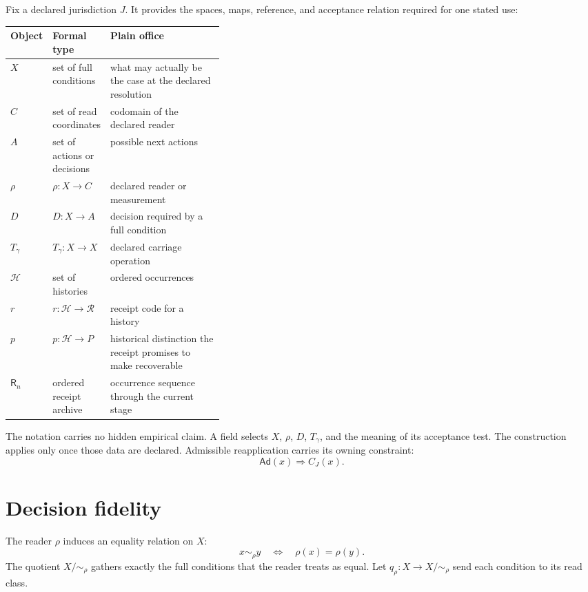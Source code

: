 \documentclass[11pt]{article}
\begin{document}
Fix a declared jurisdiction $J$. It provides the spaces, maps, reference, and acceptance relation required for one stated use:

\begin{center}
\begin{tabularx}{\linewidth}{@{}>{\bfseries}p{0.14\linewidth}p{0.22\linewidth}Y@{}}
\toprule
Object & Formal type & Plain office \\
\midrule
$X$ & set of full conditions & what may actually be the case at the declared resolution \\
$C$ & set of read coordinates & codomain of the declared reader \\
$A$ & set of actions or decisions & possible next actions \\
$\rho$ & $\rho:X\to C$ & declared reader or measurement \\
$D$ & $D:X\to A$ & decision required by a full condition \\
$T_\gamma$ & $T_\gamma:X\to X$ & declared carriage operation \\
$\mathcal H$ & set of histories & ordered occurrences \\
$r$ & $r:\mathcal H\to\mathcal R$ & receipt code for a history \\
$p$ & $p:\mathcal H\to P$ & historical distinction the receipt promises to make recoverable \\
$\mathsf R_n$ & ordered receipt archive & occurrence sequence through the current stage \\
\bottomrule
\end{tabularx}
\end{center}

The notation carries no hidden empirical claim. A field selects $X$, $\rho$, $D$, $T_\gamma$, and the meaning of its acceptance test. The construction applies only once those data are declared. Admissible reapplication carries its owning constraint:
\[
\boxed{\mathsf{Ad}(x)\Longrightarrow C_J(x).}
\tag{4}\label{eq:ad}
\]

\section{Decision fidelity}

The reader $\rho$ induces an equality relation on $X$:
\[
x\sim_\rho y\quad\Longleftrightarrow\quad \rho(x)=\rho(y).
\tag{5}\label{eq:eqkernel}
\]
The quotient $X/{\sim_\rho}$ gathers exactly the full conditions that the reader treats as equal. Let $q_\rho:X\to X/{\sim_\rho}$ send each condition to its read class.
\end{document}
